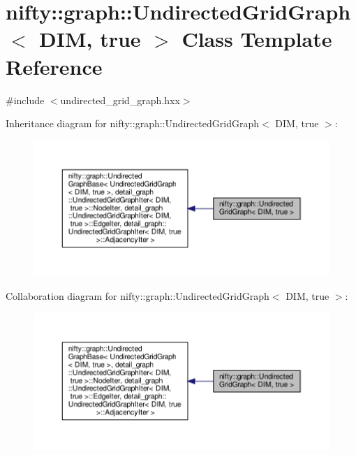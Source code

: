 \hypertarget{classnifty_1_1graph_1_1UndirectedGridGraph_3_01DIM_00_01true_01_4}{}\section{nifty\+:\+:graph\+:\+:Undirected\+Grid\+Graph$<$ D\+IM, true $>$ Class Template Reference}
\label{classnifty_1_1graph_1_1UndirectedGridGraph_3_01DIM_00_01true_01_4}


{\ttfamily \#include $<$undirected\+\_\+grid\+\_\+graph.\+hxx$>$}



Inheritance diagram for nifty\+:\+:graph\+:\+:Undirected\+Grid\+Graph$<$ D\+IM, true $>$\+:
\nopagebreak
\begin{figure}[H]
\begin{center}
\leavevmode
\includegraphics[width=350pt]{classnifty_1_1graph_1_1UndirectedGridGraph_3_01DIM_00_01true_01_4__inherit__graph}
\end{center}
\end{figure}


Collaboration diagram for nifty\+:\+:graph\+:\+:Undirected\+Grid\+Graph$<$ D\+IM, true $>$\+:
\nopagebreak
\begin{figure}[H]
\begin{center}
\leavevmode
\includegraphics[width=350pt]{classnifty_1_1graph_1_1UndirectedGridGraph_3_01DIM_00_01true_01_4__coll__graph}
\end{center}
\end{figure}
